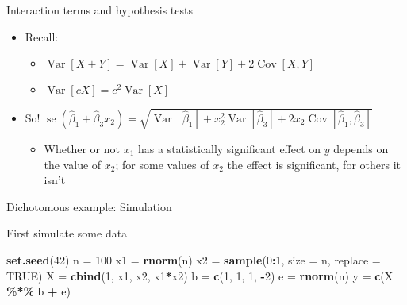 \documentclass[
  ignorenonframetext,
]{beamer}
\newenvironment{Shaded}{\begin{snugshade}}{\end{snugshade}}
\newcommand{\AttributeTok}[1]{\textcolor[rgb]{0.13,0.29,0.53}{#1}}
\newcommand{\ConstantTok}[1]{\textcolor[rgb]{0.56,0.35,0.01}{#1}}
\newcommand{\DecValTok}[1]{\textcolor[rgb]{0.00,0.00,0.81}{#1}}
\newcommand{\FunctionTok}[1]{\textcolor[rgb]{0.13,0.29,0.53}{\textbf{#1}}}
\newcommand{\NormalTok}[1]{#1}
\newcommand{\OtherTok}[1]{\textcolor[rgb]{0.56,0.35,0.01}{#1}}
\newcommand{\SpecialCharTok}[1]{\textcolor[rgb]{0.81,0.36,0.00}{\textbf{#1}}}
\providecommand{\tightlist}{%
  \setlength{\itemsep}{0pt}\setlength{\parskip}{0pt}}
\newcommand{\setsep}{\setlength{\itemsep}{3pt}}
\newcommand{\setskip}{\setlength{\parskip}{3pt}}
\renewcommand{\tightlist}{\setsep\setskip}
\begin{document}
\begin{frame}{Interaction terms and hypothesis tests}
\protect\hypertarget{interaction-terms-and-hypothesis-tests}{}
\pause

\begin{itemize}[<+->]
\tightlist
\item
  Recall:

  \begin{itemize}[<+->]
  \tightlist
  \item
    \(\ensuremath{\mathop{\mathrm{Var}}\left[X + Y\right]} = \ensuremath{\mathop{\mathrm{Var}}\left[X\right]} + \ensuremath{\mathop{\mathrm{Var}}\left[Y\right]} + 2\ensuremath{\mathop{\mathrm{Cov}}\left[X, Y\right]}\)
  \item
    \(\ensuremath{\mathop{\mathrm{Var}}\left[c X\right]} = c^2 \ensuremath{\mathop{\mathrm{Var}}\left[X\right]}\)
  \end{itemize}
\item
  So! \(\mathop{\mathrm{se}}\left(\hat{\beta}_1 + \hat{\beta}_3 x_2\right) = \sqrt{\ensuremath{\mathop{\mathrm{Var}}\left[\hat{\beta}_1\right]} + x_2^2 \ensuremath{\mathop{\mathrm{Var}}\left[\hat{\beta}_3\right]} + 2 x_2 \ensuremath{\mathop{\mathrm{Cov}}\left[\hat{\beta}_1, \hat{\beta}_3\right]}}\)

  \begin{itemize}[<+->]
  \tightlist
  \item
    Whether or not \(x_1\) has a statistically significant effect on \(y\) depends on the value of \(x_2\); for some values of \(x_2\) the effect is significant, for others it isn't
  \end{itemize}
\end{itemize}
\end{frame}

\begin{frame}[fragile]{Dichotomous example: Simulation}
\protect\hypertarget{dichotomous-example-simulation}{}
\pause

First simulate some data

\begin{Shaded}
\begin{Highlighting}[]
\FunctionTok{set.seed}\NormalTok{(}\DecValTok{42}\NormalTok{)}
\NormalTok{n  }\OtherTok{=} \DecValTok{100}
\NormalTok{x1 }\OtherTok{=} \FunctionTok{rnorm}\NormalTok{(n)}
\NormalTok{x2 }\OtherTok{=} \FunctionTok{sample}\NormalTok{(}\DecValTok{0}\SpecialCharTok{:}\DecValTok{1}\NormalTok{, }\AttributeTok{size =}\NormalTok{ n, }\AttributeTok{replace =} \ConstantTok{TRUE}\NormalTok{)}
\NormalTok{X  }\OtherTok{=} \FunctionTok{cbind}\NormalTok{(}\DecValTok{1}\NormalTok{, x1, x2, x1}\SpecialCharTok{*}\NormalTok{x2)}
\NormalTok{b  }\OtherTok{=} \FunctionTok{c}\NormalTok{(}\DecValTok{1}\NormalTok{, }\DecValTok{1}\NormalTok{, }\DecValTok{1}\NormalTok{, }\SpecialCharTok{{-}}\DecValTok{2}\NormalTok{)}
\NormalTok{e  }\OtherTok{=} \FunctionTok{rnorm}\NormalTok{(n)}
\NormalTok{y  }\OtherTok{=} \FunctionTok{c}\NormalTok{(X }\SpecialCharTok{\%*\%}\NormalTok{ b }\SpecialCharTok{+}\NormalTok{ e)}
\end{Highlighting}
\end{Shaded}
\end{frame}
\end{document}
